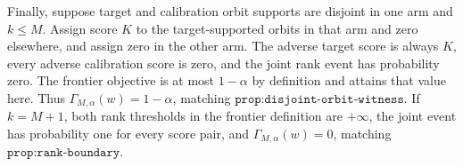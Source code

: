 Finally, suppose target and calibration orbit supports are disjoint in one arm and \(k\le M\). Assign score \(K\) to the target-supported orbits in that arm and zero elsewhere, and assign zero in the other arm. The adverse target score is always \(K\), every adverse calibration score is zero, and the joint rank event has probability zero. The frontier objective is at most \(1-\alpha\) by definition and attains that value here. Thus \(\Gamma_{M,\alpha}(w)=1-\alpha\), matching \(\texttt{prop:disjoint-orbit-witness}\). If \(k=M+1\), both rank thresholds in the frontier definition are \(+\infty\), the joint event has probability one for every score pair, and \(\Gamma_{M,\alpha}(w)=0\), matching \(\texttt{prop:rank-boundary}\).